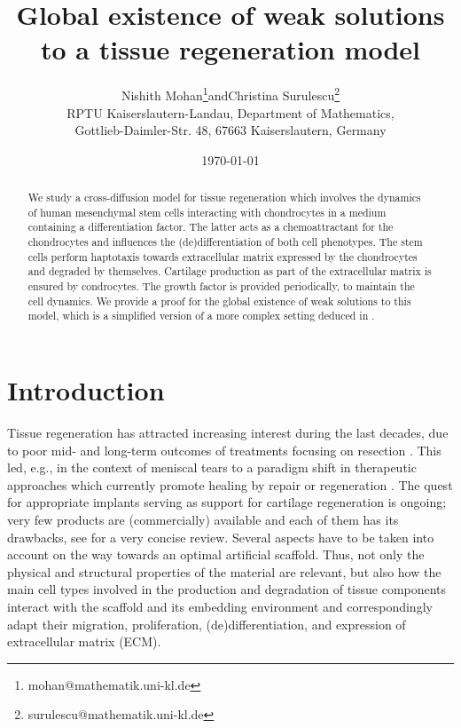 \documentclass[a4paper,10pt]{article}
\theoremstyle{definition}
\begin{document}
	\enlargethispage{10mm}

\title{Global existence of weak solutions to a tissue regeneration model}
\author{Nishith Mohan\footnote{mohan@mathematik.uni-kl.de}\quad  and\quad  Christina Surulescu\footnote{surulescu@mathematik.uni-kl.de}\\
	{\small RPTU Kaiserslautern-Landau, Department of Mathematics,} \\
	{\small Gottlieb-Daimler-Str. 48, 67663 Kaiserslautern, Germany}}

\date{\today}
\maketitle

\begin{abstract} We study a cross-diffusion model for tissue regeneration which involves the dynamics of human mesenchymal stem cells interacting with chondrocytes in a medium containing  a differentiation factor. The latter acts as a chemoattractant for the chondrocytes and influences the (de)differentiation of both cell phenotypes. The stem cells perform haptotaxis towards extracellular matrix expressed by the chondrocytes and degraded by themselves. Cartilage production as part of the extracellular matrix is ensured by condrocytes. The growth factor is provided periodically, to maintain the cell dynamics. We provide a proof for the global existence of weak solutions to this model, which is a simplified version of a more complex setting deduced in \cite{surulescu_AMM}.  
\end{abstract}	

\section{Introduction}

Tissue regeneration has attracted increasing interest during the last decades, due to poor mid- and long-term outcomes of treatments focusing on resection \cite{Paxton2011,Stein2010}. This led, e.g., in the context of meniscal tears to a paradigm shift in therapeutic approaches which currently promote healing by repair or regeneration \cite{Makris2014,Pillai2018}. The quest for appropriate implants serving as support for cartilage regeneration is ongoing; very few products are (commercially) available and each of them has its drawbacks, see \cite{surulescu_AMM} for a very concise review. Several aspects have to be taken into account on the way towards an optimal artificial scaffold. Thus, not only the physical and structural properties of the material are relevant, but also how the main cell types involved in the production and degradation of tissue components interact with the scaffold and its embedding environment and correspondingly adapt their migration, proliferation, (de)differentiation, and expression of extracellular matrix (ECM). \\[-2ex]
\end{document}
